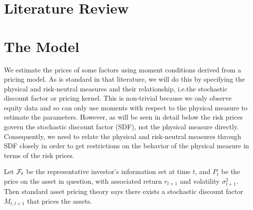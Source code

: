 \documentclass[11pt, letterpaper, twoside, final]{article}
\begin{document}
\section{Literature Review}\label{sec:lit_review}

\section{The Model}\label{sec:model}

\addtocounter{subsection}{1}

We estimate the prices of some factors using moment conditions derived from a pricing model.  As is standard in that literature, we will do this by specifying the physical and risk-neutral measures and their relationship, i.e.\@ the stochastic discount factor or pricing kernel. This is non-trivial because we only observe equity data and so can only use moments with respect to the physical measure to estimate the parameters.  However, as will be seen in detail below the risk prices govern the stochastic discount factor (SDF), not the physical measure directly.  Consequently, we need to relate the physical and risk-neutral measures through SDF closely in order to get restrictions on the behavior of the physical measure in terms of the risk prices. 

Let $\mathcal{F}_t$ be the representative investor's information set at time $t$, and $P_t$ be the price on the asset in question, with associated return $r_{t+1}$ and volatility $\sigma^2_{t+1}$. Then standard asset pricing theory says there exists a stochastic discount factor $M_{t,t+1}$ that prices the assets.  %


\end{document}
